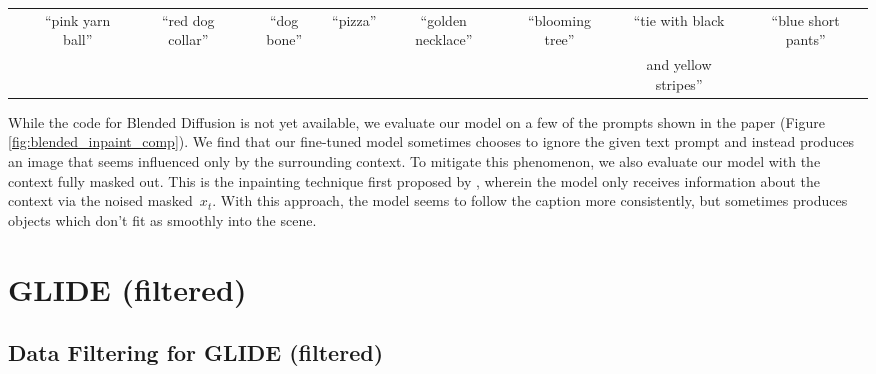 \documentclass{article}
\newcommand{\modelname}{GLIDE}
\begin{document}
\begin{figure*}[t]
\begin{tabular}{ccccccccc}
        &
        \scriptsize{``pink yarn ball''} &
        \scriptsize{``red dog collar''} &
        \scriptsize{``dog bone''} &
        \scriptsize{``pizza''} &
        \scriptsize{``golden necklace''} &
        \scriptsize{``blooming tree''} &
        \scriptsize{``tie with black} &
        \scriptsize{``blue short pants''} \\

        &&&&&&& \scriptsize{and yellow stripes''} & \\
    \end{tabular}
    
    \caption{Comparison of image inpainting quality on real images. (1) Local CLIP-guided diffusion \citep{clipdiff}, (2) PaintByWord++ \citep{paintbyword,blendeddiff}, (3) Blended Diffusion \citep{blendeddiff}. For our results, we follow \citet{blendeddiff} and use CLIP to select the best of 64 samples. Our fine-tuned samples have more realistic lighting, shadows and textures, but sometimes don't focus on the prompt (eg. golden necklace), whereas implicit samples capture the prompt better.}
    \label{fig:blended_inpaint_comp}
    \vskip -0.1in
\end{figure*}

While the code for Blended Diffusion \citep{blendeddiff} is not yet available, we evaluate our model on a few of the prompts shown in the paper (Figure \ref{fig:blended_inpaint_comp}). We find that our fine-tuned model sometimes chooses to ignore the given text prompt and instead produces an image that seems influenced only by the surrounding context. To mitigate this phenomenon, we also evaluate our model with the context fully masked out. This is the inpainting technique first proposed by \citet{dickstein}, wherein the model only receives information about the context via the noised masked~$x_t$. With this approach, the model seems to follow the caption more consistently, but sometimes produces objects which don't fit as smoothly into the scene.

\section{\modelname{} (filtered)}
\subsection{Data Filtering for \modelname{} (filtered)}
\label{app:data_filtering}
\end{document}

